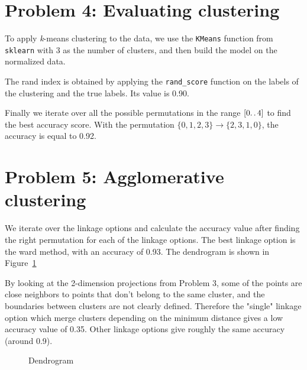 \documentclass[a4paper]{article}
\begin{document}
\section*{Problem 4: Evaluating clustering}
To apply \textit{k}-means clustering to the data, we use the \verb|KMeans| function from \verb|sklearn| with 3 as the number of clusters, and then build the model on the normalized data.

The rand index is obtained by applying the \verb|rand_score| function on the labels of the clustering and the true labels. Its value is 0.90.

Finally we iterate over all the possible permutations in the range $ [0\ldotp\ldotp4] $ to find the best accuracy score. With the permutation $\{0, 1, 2, 3\} \rightarrow \{2, 3, 1, 0\}$, the accuracy is equal to 0.92.

\section*{Problem 5: Agglomerative clustering}
We iterate over the linkage options and calculate the accuracy value after finding the right permutation for each of the linkage options. The best linkage option is the ward method, with an accuracy of 0.93.
The dendrogram is shown in Figure~\ref{fig:dendrogram}

By looking at the 2-dimension projections from Problem 3, some of the points are close neighbors to points that don't belong to the same cluster, and the boundaries between clusters are not clearly defined.
Therefore the "single" linkage option which merge clusters depending on the minimum distance gives a low accuracy value of 0.35.
Other linkage options give roughly the same accuracy (around 0.9).

\begin{figure}[H]
  \begin{center}
    \caption{Dendrogram}
    \label{fig:dendrogram}
  \end{center}
\end{figure}
\end{document}
